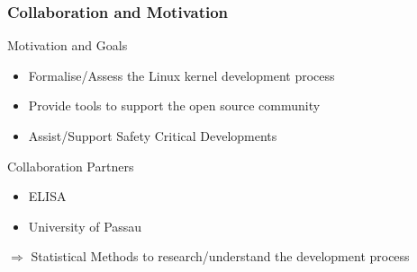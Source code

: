 \documentclass[12pt]{beamer}
\begin{document}

	\begin{frame}
	\frametitle{Collaboration and Motivation}
		\begin{block}{Motivation and Goals}
			\begin{itemize}
				\item Formalise/Assess the Linux kernel development process
				\item Provide tools to support the open source community
				\item Assist/Support Safety Critical Developments
			\end{itemize}
		\end{block}
		\begin{block}{Collaboration Partners}
			\begin{itemize}
				\item ELISA
				\item University of Passau
			\end{itemize}
		\end{block}
		$\Rightarrow$ Statistical Methods to research/understand the development process
	\end{frame}

\end{document}
